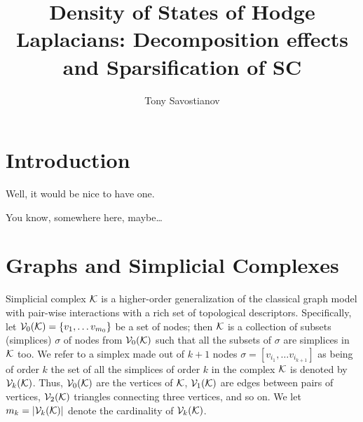 \documentclass{mynotes}
\title{Density of States of Hodge Laplacians: Decomposition effects and Sparsification of SC}
\author[1]{ Tony Savostianov }
\affil[1]{ RWTH, Aachen   \\ email: \email{a.s.savostyanov@gmail.com} }
\begin{document}
\maketitle


\chapter{Introduction}

Well, it would be nice to have one. 

You know, somewhere here, maybe\dots


\chapter{ Graphs and Simplicial Complexes }

Simplicial complex \( \mathcal{K} \) is a higher-order generalization of the classical graph model with pair-wise interactions with a rich set of topological descriptors. Specifically, let \( \mathcal{V}_{0}(\mathcal{K}) = \{ v_1, \dots v_{m_0} \} \) be a set of nodes; then \( \mathcal{K} \) is a collection of subsets (simplices) \( \sigma \) of nodes from \( \mathcal{V}_{0}(\mathcal{K}) \) such that all the subsets of \( \sigma \) are simplices in \( \mathcal{K} \) too.
We refer to a simplex made out of \( k + 1 \) nodes \( \sigma = [ v_{i_1}, \ldots v_{i_{k+1}} ] \) as being of order \( k \)%
the set of all the simplices of order \( k \) in the complex \( \mathcal{K} \) is denoted by \( \mathcal{V}_{k}(\mathcal{K}) \). Thus, \( \mathcal{V}_{0}(\mathcal{K}) \) are the vertices of \( \mathcal{K} \), \( \mathcal{V}_{1}(\mathcal{K}) \) are edges between pairs of vertices, \( \mathcal{V}_{2}(\mathcal{K}) \) triangles connecting three vertices, and so on. We let \( m_k = | \mathcal{V}_{k}(\mathcal{K}) | \) denote the cardinality of \( \mathcal{V}_{k}(\mathcal{K})\).
\end{document}
